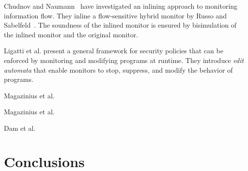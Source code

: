 \documentclass{llncs}
\begin{document}
Chudnov and
Naumann~\cite{Chudnov:Naumann:CSF10} have investigated an inlining
approach to monitoring information flow. They inline a flow-sensitive
hybrid monitor by Russo and
Sabelfeld~\cite{Russo:Sabelfeld:CSF10}. The soundness of the inlined
monitor is ensured by bisimulation of the inlined monitor and the
original monitor.

Ligatti et al. \cite{Ligatti05editautomata:} present a 
general framework for security policies that can
be enforced by monitoring and modifying programs at runtime. 
They introduce \emph{edit automata} that enable
monitors to stop, suppress, and modify the behavior of programs. 

Magazinius et al.~\cite{DBLP:conf/nordsec/MagaziniusPS10}

Magazinius et al.~\cite{DBLP:journals/compsec/MagaziniusRS12}

Dam et al.~\cite{DBLP:conf/ecoop/DamJLP09,DBLP:journals/jcs/DamJLP10,DBLP:conf/ccs/DamGL12}

\section{Conclusions}
\label{sec:conc}



\end{document}
